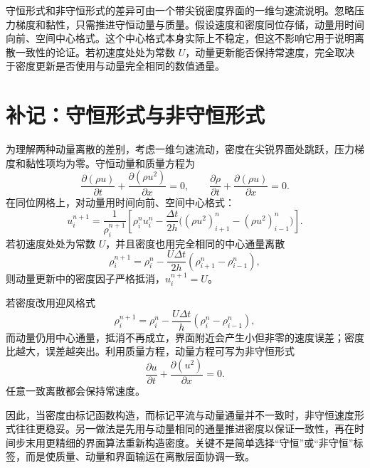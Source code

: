 \documentclass[11pt,a4paper,openany,fontset=none]{ctexbook}
\begin{document}
守恒形式和非守恒形式的差异可由一个带尖锐密度界面的一维匀速流说明。忽略压力梯度和黏性，只需推进守恒动量与质量。假设速度和密度同位存储，动量用时间向前、空间中心格式。这个中心格式本身实际上不稳定，但这不影响它用于说明离散一致性的论证。若初速度处处为常数 $U$，动量更新能否保持常速度，完全取决于密度更新是否使用与动量完全相同的数值通量。

\section{补记：守恒形式与非守恒形式}

为理解两种动量离散的差别，考虑一维匀速流动，密度在尖锐界面处跳跃，压力梯度和黏性项均为零。守恒动量和质量方程为
\begin{equation}
 \frac{\partial(\rho u)}{\partial t}+\frac{\partial(\rho u^2)}{\partial x}=0,
 \qquad
 \frac{\partial\rho}{\partial t}+\frac{\partial(\rho u)}{\partial x}=0. \tag{3.57--3.58}
\end{equation}
在同位网格上，对动量用时间向前、空间中心格式：
\begin{equation}
 u_i^{n+1}=\frac1{\rho_i^{n+1}}\left[\rho_i^nu_i^n-
 \frac{\Delta t}{2h}\bigl((\rho u^2)_{i+1}^n-(\rho u^2)_{i-1}^n\bigr)\right]. \tag{3.59}
\end{equation}
若初速度处处为常数 $U$，并且密度也用完全相同的中心通量离散
\begin{equation}
 \rho_i^{n+1}=\rho_i^n-\frac{U\Delta t}{2h}(\rho_{i+1}^n-\rho_{i-1}^n), \tag{3.61}
\end{equation}
则动量更新中的密度因子严格抵消，$u_i^{n+1}=U$。

若密度改用迎风格式
\begin{equation}
 \rho_i^{n+1}=\rho_i^n-\frac{U\Delta t}{h}(\rho_i^n-\rho_{i-1}^n), \tag{3.62}
\end{equation}
而动量仍用中心通量，抵消不再成立，界面附近会产生小但非零的速度误差；密度比越大，误差越突出。利用质量方程，动量方程可写为非守恒形式
\begin{equation}
 \frac{\partial u}{\partial t}+\frac{\partial(u^2)}{\partial x}=0. \tag{3.63}
\end{equation}
任意一致离散都会保持常速度。

因此，当密度由标记函数构造，而标记平流与动量通量并不一致时，非守恒速度形式往往更稳妥。另一做法是先用与动量相同的通量推进密度以保证一致性，再在时间步末用更精细的界面算法重新构造密度。关键不是简单选择“守恒”或“非守恒”标签，而是使质量、动量和界面输运在离散层面协调一致。
\end{document}
